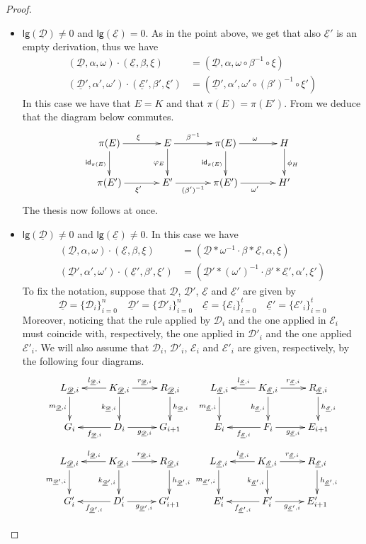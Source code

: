 \documentclass[a4paper]{article}
\newcommand{\id}[1]{\mathsf{id}_{#1}}
\newcommand{\dder}[1]{\mathscr{#1}}
\newcommand{\der}[1]{\underline{\dder{#1}}}
\newcommand{\lgh}[0]{\mathsf{lg}}
\theoremstyle{definition}
\begin{document}
\begin{proof}
\begin{itemize}
\item $\lgh(\der{D})\neq 0$ and $\lgh(\der{E})= 0$. As in the point above, we get that also $\der{E}'$  is an empty derivation, thus we have
\begin{align*}
	(\der{D}, \alpha, \omega)\cdot (\der{E}, \beta, \xi)&=(\der{D},  \alpha, \omega \circ \beta^{-1}\circ \xi)\\
	(\der{D}', \alpha', \omega')\cdot (\der{E}', \beta', \xi')&=(\der{D}',  \alpha', \omega' \circ (\beta')^{-1}\circ \xi')
\end{align*}
In this case we have that $E=K$ and that $\pi(E)=\pi(E')$. From  we deduce that the diagram below commutes.
\[\xymatrix@C=35pt{\pi(E) \ar[r]^{\xi} \ar[d]_{\id{\pi(E)}}& E  \ar[d]_{\varphi_E}\ar[r]^-{\beta^{-1}} & \pi(E) \ar[d]_{\id{\pi(E)}} \ar[r]^{\omega}& H \ar[d]^{\phi_H}\\\pi(E') \ar[r]_{\xi'}& E' \ar[r]_-{(\beta')^{-1}} & \pi(E') \ar[r]_{\omega'} & H'}\]
The thesis now follows at once.
	\item $\lgh(\der{D})\neq 0$ and $\lgh(\der{E})\neq 0$. In this case we have
	\begin{align*}
		(\der{D}, \alpha, \omega)\cdot (\der{E}, \beta, \xi)&=(\der{D}*\omega^{-1}\cdot \beta*\der{E}, \alpha, \xi)\\
		(\der{D}', \alpha', \omega')\cdot (\der{E}', \beta', \xi')&=(\der{D}'*(\omega')^{-1}\cdot \beta'*\der{E'}, \alpha', \xi')
	\end{align*}
 To fix the notation, suppose that $\der{D}$, $\der{D}'$, $\der{E}$ and $\der{E}'$ are given by
	\[\der{D}=\{\dder{D}_i\}_{i=0}^n \quad \der{D}'=\{\dder{D}'_i\}_{i=0}^n \quad \der{E}=\{\dder{E}_i\}_{i=0}^t \quad \der{E}'=\{\dder{E}'_i\}_{i=0}^t\]
	Moreover, noticing that the rule applied by $\dder{D}_i$ and the one applied in $\mathcal{E}_i$  must coincide with, respectively, the one applied in $\dder{D}'_i$ and the one applied $\dder{E}'_i$. We will also assume that $\dder{D}_i$, $\dder{D}'_i$, $\dder{E}_i$ and $\dder{E}'_i$ are given, respectively, by the following four diagrams. 
	\[\xymatrix{L_{\der{D},i} \ar[d]_{m_{\der{D}, i}}& K_{\der{D},i} \ar[d]_{k_{\der{D}, i}} \ar[r]^{r_{\der{D},i}} \ar[l]_{l_{\der{D},i}} & R_{\der{D},i}\ar[d]^{h_{\der{D}, i}} &L_{\der{E},i} \ar[d]_{m_{\der{E}, i}}& K_{\der{E},i} \ar[d]_{k_{\der{E}, i}} \ar[r]^{r_{\der{E},i}} \ar[l]_{l_{\der{E},i}} & R_{\der{E},i}\ar[d]^{h_{\der{E}, i}} \\G_i & D_i \ar[r]_{g_{\der{D},i}} \ar[l]^{f_{\der{D},i}} & G_{i+1} & E_i & F_i\ar[r]_{g_{\der{E},i}} \ar[l]^{f_{\der{E},i}}  & E_{i+1}}\]
	\[\xymatrix{L_{\der{D},i} \ar[d]_{m_{\der{D}', i}}& K_{\der{D},i} \ar[d]_{k_{\der{D}', i}} \ar[r]^{r_{\der{D},i}} \ar[l]_{l_{\der{D},i}} & R_{\der{D},i}\ar[d]^{h_{\der{D}', i}} &L_{\der{E},i} \ar[d]_{m_{\der{E}', i}}& K_{\der{E},i} \ar[d]_{k_{\der{E}', i}} \ar[r]^{r_{\der{E},i}} \ar[l]_{l_{\der{E},i}} & R_{\der{E},i}\ar[d]^{h_{\der{E}', i}} \\G'_i & D'_i \ar[r]_{g_{\der{D}',i}} \ar[l]^{f_{\der{D}',i}} & G'_{i+1} & E'_i & F'_i\ar[r]_{g_{\der{E}',i}} \ar[l]^{f_{\der{E}',i}}  & E'_{i+1}}\]
	

\end{itemize}
\end{proof}
\end{document}

